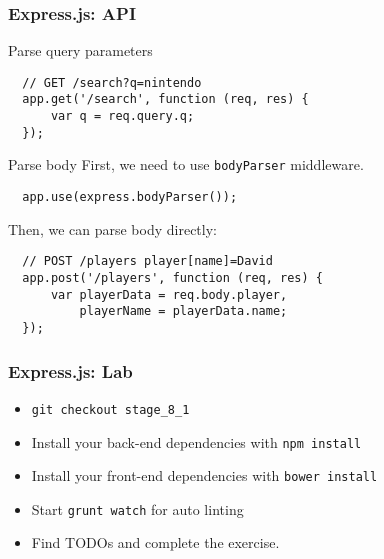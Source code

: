 \begin{frame}[fragile]
  \frametitle{Express.js: API}

  \begin{block}{Parse query parameters}
  {\tiny
  \begin{verbatim}
  // GET /search?q=nintendo
  app.get('/search', function (req, res) {
      var q = req.query.q;
  });
  \end{verbatim}
  }
  \end{block}

  \pause

  \begin{block}{Parse body}
  First, we need to use \texttt{bodyParser} middleware.
  {\tiny
  \begin{verbatim}
  app.use(express.bodyParser());
  \end{verbatim}
  }
  Then, we can parse body directly:
  {\tiny
  \begin{verbatim}
  // POST /players player[name]=David
  app.post('/players', function (req, res) {
      var playerData = req.body.player,
          playerName = playerData.name;
  });
  \end{verbatim}
  }

  \end{block}
\end{frame}

\begin{frame}[fragile]
  \frametitle{Express.js: Lab}

  \begin{itemize}
    \item \texttt{git checkout stage\_8\_1}
    \item Install your back-end dependencies with \texttt{npm install}
    \item Install your front-end dependencies with \texttt{bower install}
    \item Start \texttt{grunt watch} for auto linting
    \item Find TODOs and complete the exercise.
  \end{itemize}
\end{frame}
